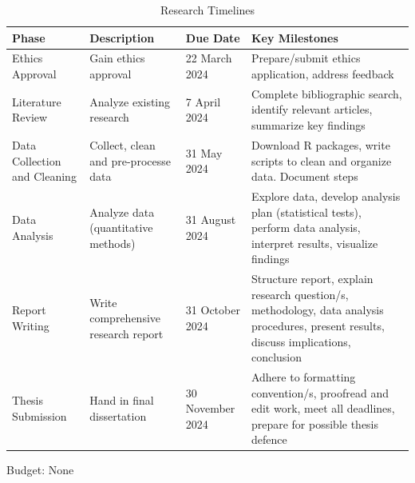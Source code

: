 \documentclass[12pt]{article}
\begin{document}
\begin{table}[hbt!]
    \centering
    \begin{tabular}{ |p{4cm}||p{4cm}|p{3.5cm}|p{4cm}|  }
    \hline    
    \textbf{Phase}  &\textbf{Description}  &\textbf{Due Date} &\textbf{Key Milestones}  \\
    \hline
    Ethics Approval   & Gain ethics approval &22 March 2024& Prepare/submit ethics application, address feedback \\
    \hline
    Literature Review   & Analyze existing research    &7 April 2024&   Complete bibliographic search, identify relevant articles, summarize key findings\\
    \hline
    Data Collection and Cleaning& Collect, clean and pre-processe data & 31 May 2024 & Download R packages, write scripts to clean and organize data. Document steps \\
    \hline
    Data Analysis & Analyze data (quantitative methods) & 31 August 2024& Explore data, develop analysis plan (statistical tests), perform data analysis, interpret results, visualize findings  \\
    \hline
    Report Writing    & Write comprehensive research report &31 October 2024 & Structure report, explain research question/s, methodology, data analysis procedures, present results, discuss implications, conclusion \\
    \hline
    Thesis Submission    & Hand in final dissertation &30 November 2024 & Adhere to formatting convention/s, proofread and edit work, meet all deadlines, prepare for possible thesis defence \\
    \hline
    \end{tabular}
    \caption{Research Timelines}
    \label{tab:my_label}
\end{table}

Budget: None


\end{document}
